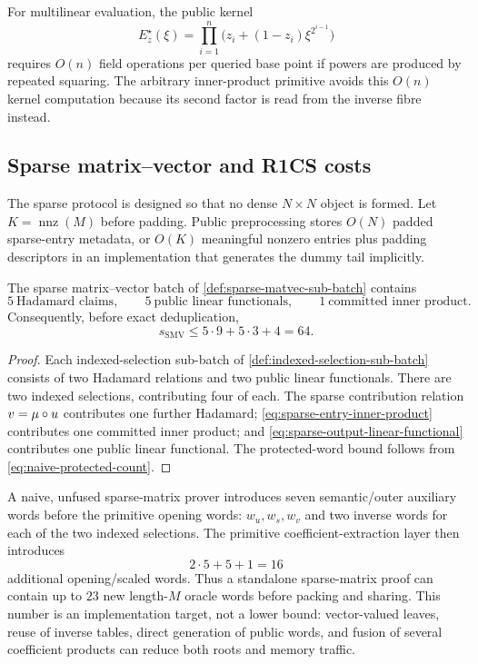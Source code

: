 For multilinear evaluation, the public kernel
\[
  E_z^\star(\xi)
  =\prod_{i=1}^{n}\bigl(z_i+(1-z_i)\xi^{2^{i-1}}\bigr)
\]
requires $O(n)$ field operations per queried base point if powers are produced by repeated squaring.  The arbitrary inner-product primitive avoids this $O(n)$ kernel computation because its second factor is read from the inverse fibre instead.

\subsection{Sparse matrix--vector and R1CS costs}
\label{sec:complexity-r1cs}

The sparse protocol is designed so that no dense $N\times N$ object is formed.  Let $K=\operatorname{nnz}(M)$ before padding.  Public preprocessing stores $O(N)$ padded sparse-entry metadata, or $O(K)$ meaningful nonzero entries plus padding descriptors in an implementation that generates the dummy tail implicitly.

\begin{proposition}
\label{prop:smv-primitive-count}
The sparse matrix--vector batch of \cref{def:sparse-matvec-sub-batch} contains
\begin{equation}
  5\ \text{Hadamard claims},
  \qquad
  5\ \text{public linear functionals},
  \qquad
  1\ \text{committed inner product}.
  \label{eq:smv-primitive-count}
\end{equation}
Consequently, before exact deduplication,
\begin{equation}
  s_{\mathrm{SMV}}\le5\cdot9+5\cdot3+4=64.
  \label{eq:smv-naive-s}
\end{equation}
\end{proposition}

\begin{proof}
Each indexed-selection sub-batch of \cref{def:indexed-selection-sub-batch} consists of two Hadamard relations and two public linear functionals.  There are two indexed selections, contributing four of each.  The sparse contribution relation $v=\mu\circ u$ contributes one further Hadamard; \eqref{eq:sparse-entry-inner-product} contributes one committed inner product; and \eqref{eq:sparse-output-linear-functional} contributes one public linear functional.  The protected-word bound follows from \eqref{eq:naive-protected-count}.
\end{proof}

A naive, unfused sparse-matrix prover introduces seven semantic/outer auxiliary words before the primitive opening words: $w_u,w_s,w_v$ and two inverse words for each of the two indexed selections.  The primitive coefficient-extraction layer then introduces
\[
  2\cdot5+5+1=16
\]
additional opening/scaled words.  Thus a standalone sparse-matrix proof can contain up to $23$ new length-$M$ oracle words before packing and sharing.  This number is an implementation target, not a lower bound: vector-valued leaves, reuse of inverse tables, direct generation of public words, and fusion of several coefficient products can reduce both roots and memory traffic.


